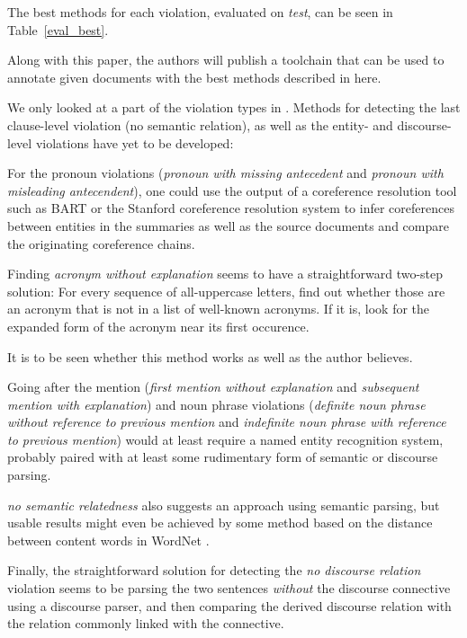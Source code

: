 \documentclass[a4paper,10pt]{scrartcl}
\theoremstyle{style}
\begin{document}
The best methods for each violation, evaluated on \textit{test}, can be seen in Table~\ref{eval_best}.

Along with this paper, the authors will publish a toolchain that can be used to annotate given documents with the best methods described in here.

We only looked at a part of the violation types in \cite{friedrichlqvsumm}. Methods for detecting the last clause-level violation (no semantic relation), as well as the entity- and discourse-level violations have yet to be developed:

For the pronoun violations (\textit{pronoun with missing antecedent} and \textit{pronoun with misleading antecendent}), one could use the output of a coreference resolution tool such as BART \citep{versley2008bart} or the Stanford coreference resolution system \citep{lee2011stanford} to infer coreferences between entities in the summaries as well as the source documents and compare the originating coreference chains.

Finding \textit{acronym without explanation} seems to have a straightforward two-step solution: For every sequence of all-uppercase letters, find out whether those are an acronym that is not in a list of well-known acronyms. If it is, look for the expanded form of the acronym near its first occurence.

It is to be seen whether this method works as well as the author believes.

Going after the mention (\textit{first mention without explanation} and \textit{subsequent mention with explanation}) and noun phrase violations (\textit{definite noun phrase without reference to previous mention} and \textit{indefinite noun phrase with reference to previous mention}) would at least require a named entity recognition system, probably paired with at least some rudimentary form of semantic or discourse parsing.

\textit{no semantic relatedness} also suggests an approach using semantic parsing, but usable results might even be achieved by some method based on the distance between content words in WordNet \citep{fellbaum2005wordnet}.

Finally, the straightforward solution for detecting the \textit{no discourse relation} violation seems to be parsing the two sentences \textit{without} the discourse connective using a discourse parser, and then comparing the derived discourse relation with the relation commonly linked with the connective.
\end{document}
